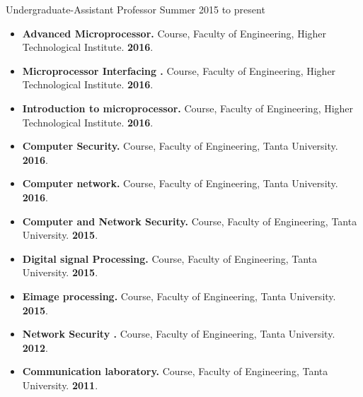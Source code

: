 \documentclass[10pt]{article}
\newenvironment{innerlist}[1][\enskip\textbullet]%
        {\begin{itemize}[#1,leftmargin=*,parsep=0pt,itemsep=0pt,topsep=0pt,partopsep=0pt]}
        {\end{itemize}}
\begin{document}
Undergraduate-Assistant Professor \hfill {Summer 2015 to present}
\begin{innerlist}

\item {\bf  Advanced Microprocessor.} Course, Faculty of Engineering, Higher Technological Institute. \hfill {\bf 2016}.\\

\item {\bf Microprocessor Interfacing .} Course, Faculty of Engineering, Higher Technological Institute. \hfill {\bf 2016}.\\

\item {\bf Introduction to microprocessor.} Course, Faculty of Engineering, Higher Technological Institute. \hfill {\bf 2016}.\\

\item {\bf Computer Security.} Course, Faculty of Engineering, Tanta University. \hfill {\bf 2016}.\\

\item {\bf Computer network.} Course, Faculty of Engineering, Tanta University. \hfill {\bf 2016}.\\

\item {\bf Computer and Network Security.} Course, Faculty of Engineering, Tanta University. \hfill {\bf 2015}.\\


\item {\bf Digital signal Processing.} Course, Faculty of Engineering, Tanta University. \hfill {\bf 2015}.\\


\item {\bf Eimage processing.} Course, Faculty of Engineering, Tanta University. \hfill {\bf 2015}.\\

\item {\bf Network Security .} Course, Faculty of Engineering, Tanta University. \hfill {\bf 2012}.\\

\item {\bf Communication laboratory.} Course, Faculty of Engineering, Tanta University. \hfill {\bf 2011}.\\




\end{innerlist}
\end{document}
